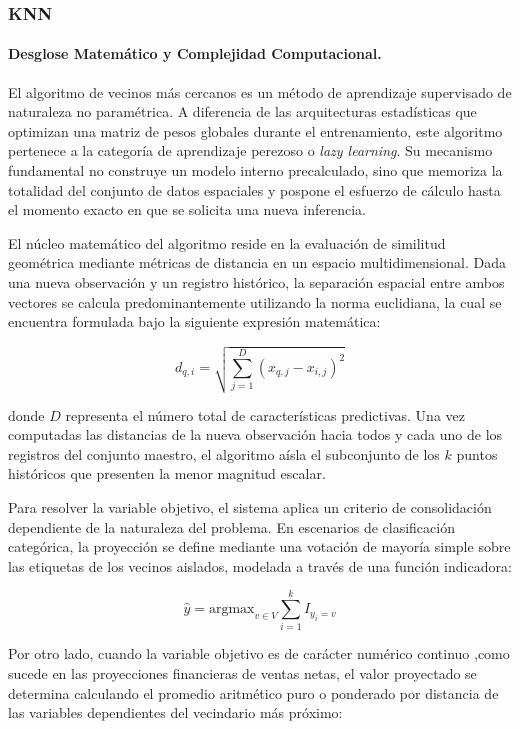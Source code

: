 \documentclass[11pt,a4paper]{report}
\begin{document}
\subsubsection{KNN}

            \paragraph{Desglose Matemático y Complejidad Computacional.}
            El algoritmo de vecinos más cercanos es un método de aprendizaje supervisado de naturaleza no paramétrica. A
            diferencia de las arquitecturas estadísticas que optimizan una matriz de pesos globales durante el entrenamiento,
            este algoritmo pertenece a la categoría de aprendizaje perezoso o \textit{lazy learning}. Su mecanismo fundamental no
            construye un modelo interno precalculado, sino que memoriza la totalidad del conjunto de datos espaciales y pospone el
            esfuerzo de cálculo hasta el momento exacto en que se solicita una nueva inferencia.

            El núcleo matemático del algoritmo reside en la evaluación de similitud geométrica mediante métricas de distancia
            en un espacio multidimensional. Dada una nueva observación y un registro histórico, la separación espacial entre ambos
            vectores se calcula predominantemente utilizando la norma euclidiana, la cual se encuentra formulada bajo la siguiente expresión matemática:

            $$d_{q,i}=\sqrt{\sum_{j=1}^{D}(x_{q,j}-x_{i,j})^2}$$

            donde $D$ representa el número total de características predictivas. Una vez computadas las distancias de la nueva
            observación hacia todos y cada uno de los registros del conjunto maestro, el algoritmo aísla el subconjunto de los $k$
            puntos históricos que presenten la menor magnitud escalar.

            Para resolver la variable objetivo, el sistema aplica un criterio de consolidación dependiente de la naturaleza
            del problema. En escenarios de clasificación categórica, la proyección se define mediante una votación de mayoría
            simple sobre las etiquetas de los vecinos aislados, modelada a través de una función indicadora:

            $$\hat{y}=\text{argmax}_{v \in V}\sum_{i=1}^{k}I_{y_i=v}$$

            Por otro lado, cuando la variable objetivo es de carácter numérico continuo ,como sucede en las proyecciones financieras de ventas netas,
            el valor proyectado se determina calculando el promedio aritmético puro o ponderado por distancia de las variables dependientes del vecindario más próximo:
\end{document}
